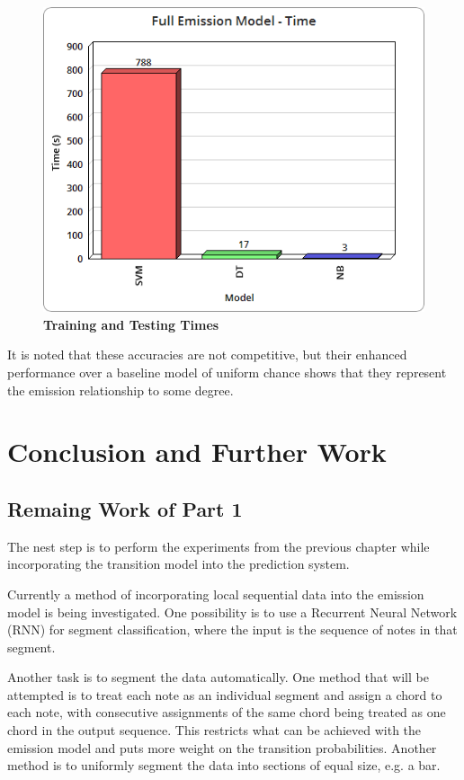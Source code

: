 \documentclass[bsc,singlespacing,parskip,deptreport]{infthesis}
\begin{document}
\begin{figure}
  \caption{\textbf{Training and Testing Times}}
  \centering
    \includegraphics[scale=0.5]{time}
\end{figure}

It is noted that these accuracies are not competitive, but their enhanced performance over a baseline model of uniform chance shows that they represent the emission relationship to some degree.

\chapter{Conclusion and Further Work}

\section{Remaing Work of Part 1}

The nest step is to perform the experiments from the previous chapter while incorporating the transition model into the prediction system.

Currently a method of incorporating local sequential data into the emission model is being investigated. One possibility is to use a Recurrent Neural Network (RNN) for segment classification, where the input is the sequence of notes in that segment.

Another task is to segment the data automatically. One method that will be attempted is to treat each note as an individual segment and assign a chord to each note, with consecutive assignments of the same chord being treated as one chord in the output sequence. This restricts what can be achieved with the emission model and puts more weight on the transition probabilities. Another method is to uniformly segment the data into sections of equal size, e.g. a bar.
\end{document}
